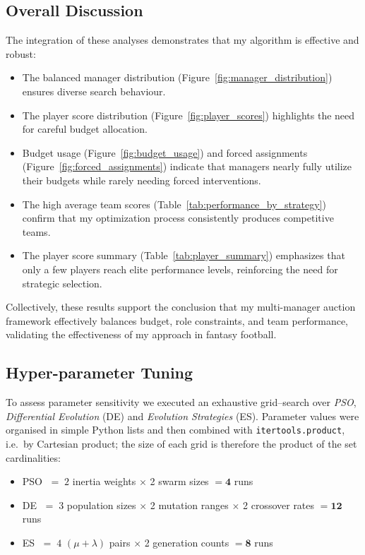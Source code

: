 \documentclass[sigconf]{acmart}
\begin{document}
	\subsection{Overall Discussion}
	The integration of these analyses demonstrates that my algorithm is effective and robust:
	\begin{itemize}
		\item The balanced manager distribution (Figure~\ref{fig:manager_distribution}) ensures diverse search behaviour.
		\item The player score distribution (Figure~\ref{fig:player_scores}) highlights the need for careful budget allocation.
		\item Budget usage (Figure~\ref{fig:budget_usage}) and forced assignments (Figure~\ref{fig:forced_assignments}) indicate that managers nearly fully utilize their budgets while rarely needing forced interventions.
		\item The high average team scores (Table~\ref{tab:performance_by_strategy}) confirm that my optimization process consistently produces competitive teams.
		\item The player score summary (Table~\ref{tab:player_summary}) emphasizes that only a few players reach elite performance levels, reinforcing the need for strategic selection.
	\end{itemize}
	
	Collectively, these results support the conclusion that my multi-manager auction framework effectively balances budget, role constraints, and team performance, validating the effectiveness of my approach in fantasy football.
	
	\subsection{Hyper-parameter Tuning}
	\label{subsec:tuning}
	
	To assess parameter sensitivity we executed an exhaustive grid–search
	over \emph{PSO}, \emph{Differential Evolution} (DE) and
	\emph{Evolution Strategies} (ES).  Parameter values were organised in
	simple Python lists and then combined with \texttt{itertools.product},
	i.e.\ by Cartesian product; the size of each grid is therefore the
	product of the set cardinalities:
	
	\begin{itemize}
		\item PSO $\;=\;2$ inertia weights $\times$ 2 swarm sizes $= \mathbf{4}$ runs
		\item DE  $\;=\;3$ population sizes $\times$ 2 mutation ranges $\times$
		2 crossover rates $= \mathbf{12}$ runs
		\item ES  $\;=\;4$ $(\mu+\lambda)$ pairs $\times$ 2 generation counts
		$= \mathbf{8}$ runs
	\end{itemize}
	
\end{document}
